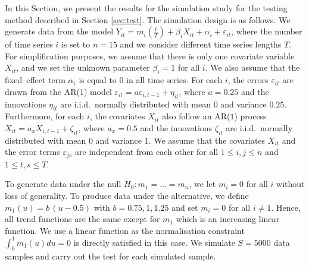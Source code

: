 \documentclass[a4paper,12pt]{article}
\begin{document}
In this Section, we present the results for the simulation study for the testing method described in Section \ref{sec:test}. The simulation design is as follows. We generate data from the model $Y_{it} =m_i(\frac{t}{T})  + \beta_i X_{it} +  \alpha_i  + \varepsilon_{it}$, where the number of time series $i$ is set to $n = 15$ and we consider different time series lengths $T$. For simplification purposes, we assume that there is only one covariate variable $X_{it}$, and we set the unknown parameter $\beta_i = 1$ for all $i$. We also assume that the fixed--effect term $\alpha_i$ is equal to $0$ in all time series. For each $i$, the errors $\varepsilon_{it}$ are drawn from the AR(1) model $\varepsilon_{it} = a \varepsilon_{i, t-1} + \eta_{it}$, where $a = 0.25$ and the innovations $\eta_{it}$ are i.i.d.\ normally distributed with mean $0$ and variance $0.25$. Furthermore, for each $i$, the covariates $X_{it}$ also follow an AR($1$) process $X_{it} = a_x X_{i, t-1} + \zeta_{it}$, where $a_x = 0.5$ and the innovations $\zeta_{it}$ are i.i.d.\ normally distributed with mean $0$ and variance $1$. We assume that the covariates $X_{it}$ and the error terms $\varepsilon_{js}$ are independent from each other for all $1 \leq i,j \leq n$ and $1 \leq t, s \leq T$.

To generate data under the null $H_0: m_1 = \ldots = m_n$, we let $m_i = 0$ for all $i$ without loss of generality. To produce data under the alternative, we define $m_1(u) = b \, (u - 0.5) $ with $b = 0.75, 1, 1.25$ and set $m_i = 0$ for all $i \ne 1$. Hence, all trend functions are the same except for $m_1$ which is an increasing linear function. We use a linear function as the normalisation constraint $\int_0^1 m_1(u) du = 0$ is directly satisfied in this case. We simulate $S = 5000$ data samples and carry out the test for each simulated sample.
\end{document}
